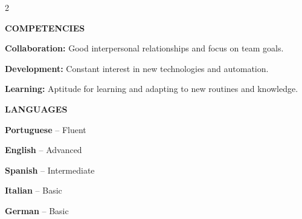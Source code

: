 \documentclass[10pt,a4paper]{article}
\newcommand{\titulo}[1]{
    \vspace{7pt}%
    {\noindent\sffamily\bfseries\fontsize{10pt}{10pt}\selectfont\textcolor{HeadingBlue}{#1}\par}
}
\newcommand{\textonormal}[2]{
  \vspace{5pt}%
  {\noindent\rmfamily\fontsize{9pt}{12pt}\selectfont\textcolor{BodyGrey}{\textbf{#1} #2}\par}%
}
\newcommand{\cvsection}[1]{%
  \titulo{#1}%
}
\newcommand{\cvskill}[2]{%
  \textonormal{#1:}{#2}
}
\newcommand{\cvidiom}[2]{%
  \begingroup
  \renewcommand{\vspace}[1]{\vskip 2pt}
  \textonormal{#1}{-- #2}%
  \endgroup
}
\begin{document}
\begin{paracol}{2}
\cvsection{COMPETENCIES}

\cvskill{Collaboration}{Good interpersonal relationships and focus on team goals.}
\cvskill{Development}{Constant interest in new technologies and automation.}
\cvskill{Learning}{Aptitude for learning and adapting to new routines and knowledge.}

\cvsection{LANGUAGES}
\cvidiom{Portuguese}{Fluent}
\cvidiom{English}{Advanced}
\cvidiom{Spanish}{Intermediate}
\cvidiom{Italian}{Basic}
\cvidiom{German}{Basic}

\end{paracol}
\end{document}
